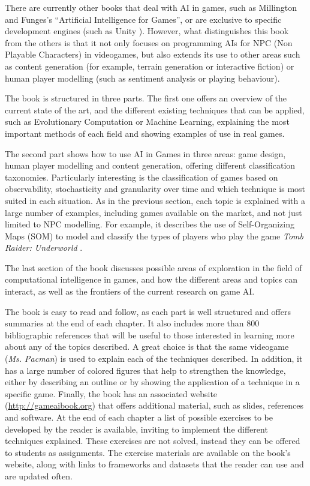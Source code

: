 \documentclass{article}
\begin{document}
There are currently other books that deal with AI in games, such as Millington and Funges's ``Artificial Intelligence for Games''\cite{millington09artificial}, or are exclusive to specific development engines (such as Unity \cite{unity17}). However, what distinguishes this book from the others is that it not only focuses on programming AIs for NPC (Non Playable Characters) in videogames, but also extends its use to other areas such as content generation (for example, terrain generation or interactive fiction) or human player modelling (such as sentiment analysis or playing behaviour).

The book is structured in three parts. The first one offers an overview of the current state of the art, and the different existing techniques that can be applied, such as Evolutionary Computation or Machine Learning, explaining the most important methods of each field and showing examples of use in real games. 

The second part shows how to use AI in Games in three areas: game design, human player modelling and content generation, offering different classification taxonomies. Particularly interesting is the classification of games based on observability, stochasticity and granularity over time and which technique is most suited in each situation. As in the previous section, each topic is explained with a large number of examples, including games available on the market, and not just limited to NPC modelling. For example, it describes the use of Self-Organizing Maps (SOM) to model and classify the types of players who play the game {\em Tomb Raider: Underworld} \cite{MahlmannDTCY10}.

The last section of the book discusses possible areas of exploration in the field of computational intelligence in games, and how the different areas and topics can interact, as well as the frontiers of the current research on game AI.

The book is easy to read and follow, as each part is well structured and offers summaries at the end of each chapter. It also includes more than 800 bibliographic references that will be useful to those interested in learning more about any of the topics described. A great choice is that the same videogame ({\em Ms. Pacman}) is used to explain each of the techniques described. In addition, it has a large number of colored figures that help to strengthen the knowledge, either by describing an outline or by showing the application of a technique in a specific game. Finally, the book has an associated website (\url{http://gameaibook.org}) that offers additional material, such as slides, references and software. At the end of each chapter a list of possible exercises to be developed by the reader is available, inviting to implement the different techniques explained. These exercises are not solved, instead they can be offered to students as assignments. The exercise materials are available on the book's website, along with links to frameworks and datasets that the reader can use and are updated often. 
\end{document}
